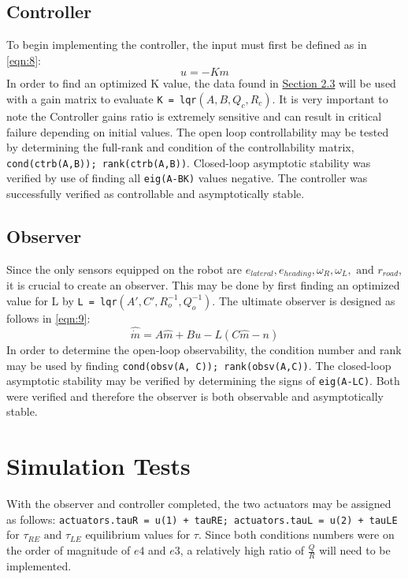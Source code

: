 \documentclass[12pt]{article}
\begin{document}
\subsection{Controller} \label{sec:3.1}
To begin implementing the controller, the input must first be defined as in \ref{eqn:8}:
\begin{equation} \label{eqn:8}
    u = -Km
\end{equation}
In order to find an optimized K value, the data found in \hyperref[sec:2.3]{Section 2.3}
will be used with a gain matrix to evaluate \lstinline{K = lqr}$(A, B, Q_c, R_c)$.
It is very important to note the Controller gains ratio is extremely sensitive and can result in critical failure depending on initial values.  The open loop controllability may be tested by determining the full-rank and condition of the controllability matrix, \lstinline{cond(ctrb(A,B)); rank(ctrb(A,B))}.  Closed-loop asymptotic stability was verified by use of finding all \lstinline{eig(A-BK)} values negative.  The controller was successfully verified as controllable and asymptotically stable.
\subsection{Observer} \label{sec:3.2}
Since the only sensors equipped on the robot are $e_{lateral}, e_{heading}, \omega_R, \omega_L, \mbox{ and } r_{road}$, it is crucial to create an observer.  This may be done by first finding an optimized value for L by \lstinline{L = lqr}$(A', C', R^{-1}_o, Q^{-1}_o)$.  The ultimate observer is designed as follows in \ref{eqn:9}:
\begin{equation} \label{eqn:9}
    \hat{\dot{m}} = A\hat{m} + Bu - L(C\hat{m} - n)
\end{equation}
In order to determine the open-loop observability, the condition number and rank may be used by finding \lstinline{cond(obsv(A, C)); rank(obsv(A,C))}.  The closed-loop asymptotic stability may be verified by determining the signs of \lstinline{eig(A-LC)}.  Both were verified and therefore the observer is both observable and asymptotically stable.

\section{Simulation Tests} \label{sec:4}
With the observer and controller completed, the two actuators may be assigned as follows: \lstinline{actuators.tauR = u(1) + tauRE; actuators.tauL = u(2) + tauLE} for $\tau_{RE} \mbox{ and } \tau_{LE}$ equilibrium values for $\tau$.  Since both conditions numbers were on the order of magnitude of $e4$ and $e3$, a relatively high ratio of $\frac{Q}{R}$ will need to be implemented.
\end{document}

